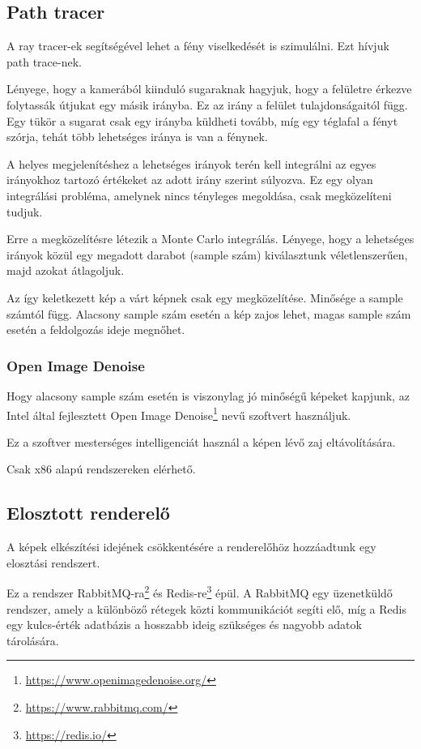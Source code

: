 \subsection{Path tracer}
A ray tracer-ek segítségével lehet a fény viselkedését is szimulálni. Ezt hívjuk path trace-nek.

Lényege, hogy a kamerából kiinduló sugaraknak hagyjuk, hogy a felületre érkezve folytassák útjukat egy másik irányba. Ez az irány a felület tulajdonságaitól függ. Egy tükör a sugarat csak egy irányba küldheti tovább, míg egy téglafal a fényt szórja, tehát több lehetséges iránya is van a fénynek.

A helyes megjelenítéshez a lehetséges irányok terén kell integrálni az egyes irányokhoz tartozó értékeket az adott irány szerint súlyozva. Ez egy olyan integrálási probléma, amelynek nincs tényleges megoldása, csak megközelíteni tudjuk.

Erre a megközelítésre létezik a Monte Carlo integrálás. Lényege, hogy a lehetséges irányok közül egy megadott darabot (sample szám) kiválasztunk véletlenszerűen, majd azokat átlagoljuk.

Az így keletkezett kép a várt képnek csak egy megközelítése. Minősége a sample számtól függ. Alacsony sample szám esetén a kép zajos lehet, magas sample szám esetén a feldolgozás ideje megnőhet.

\subsubsection{Open Image Denoise}
Hogy alacsony sample szám esetén is viszonylag jó minőségű képeket kapjunk, az Intel által fejlesztett Open Image Denoise\footnote{\url{https://www.openimagedenoise.org/}} nevű szoftvert használjuk.

Ez a szoftver mesterséges intelligenciát használ a képen lévő zaj eltávolítására.

Csak x86 alapú rendszereken elérhető.


\subsection{Elosztott renderelő}

A képek elkészítési idejének csökkentésére a renderelőhöz hozzáadtunk egy elosztási rendszert.

Ez a rendszer RabbitMQ-ra\footnote{\url{https://www.rabbitmq.com/}} és Redis-re\footnote{\url{https://redis.io/}} épül. A RabbitMQ egy üzenetküldő rendszer, amely a különböző rétegek közti kommunikációt segíti elő, míg a Redis egy kulcs-érték adatbázis a hosszabb ideig szükséges és nagyobb adatok tárolására.

